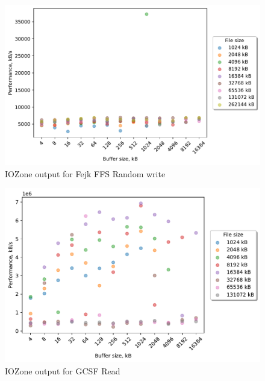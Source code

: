 \begin{figure}[!htb]
	\label{fig:bench_fffs_rnd_write}
	\begin{center}
		\includegraphics[width=1.0\textwidth]{figures.nosync/benchmarking/fejk-ffs/Random write.pdf}
	\end{center}
	\caption{IOZone output for Fejk FFS Random write}
\end{figure}

\begin{figure}[!htb]
	\label{fig:bench_gcsf_read}
	\begin{center}
		\includegraphics[width=1.0\textwidth]{figures.nosync/benchmarking/gcsf/Read.pdf}
	\end{center}
	\caption{IOZone output for GCSF Read}
\end{figure}

